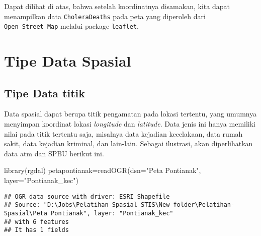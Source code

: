 \documentclass[
]{book}
\newenvironment{Shaded}{\begin{snugshade}}{\end{snugshade}}
\newcommand{\AttributeTok}[1]{\textcolor[rgb]{0.77,0.63,0.00}{#1}}
\newcommand{\DecValTok}[1]{\textcolor[rgb]{0.00,0.00,0.81}{#1}}
\newcommand{\FunctionTok}[1]{\textcolor[rgb]{0.00,0.00,0.00}{#1}}
\newcommand{\NormalTok}[1]{#1}
\newcommand{\OtherTok}[1]{\textcolor[rgb]{0.56,0.35,0.01}{#1}}
\newcommand{\SpecialCharTok}[1]{\textcolor[rgb]{0.00,0.00,0.00}{#1}}
\newcommand{\StringTok}[1]{\textcolor[rgb]{0.31,0.60,0.02}{#1}}
\begin{document}
Dapat dilihat di atas, bahwa setelah koordinatnya disamakan, kita dapat menampilkan data \texttt{CholeraDeaths} pada peta yang diperoleh dari \texttt{Open\ Street\ Map} melalui package \texttt{leaflet}.

\hypertarget{tipe-data-spasial}{%
\section{Tipe Data Spasial}\label{tipe-data-spasial}}

\hypertarget{tipe-data-titik}{%
\subsection{Tipe Data titik}\label{tipe-data-titik}}

Data spasial dapat berupa titik pengamatan pada lokasi tertentu, yang umumnya menyimpan koordinat lokasi \emph{longitude} dan \emph{latitude}. Data jenis ini hanya memiliki nilai pada titik tertentu saja, misalnya data kejadian kecelakaan, data rumah sakit, data kejadian kriminal, dan lain-lain. Sebagai ilustrasi, akan diperlihatkan data atm dan SPBU berikut ini.

\begin{Shaded}
\begin{Highlighting}[]
\FunctionTok{library}\NormalTok{(rgdal)}
\NormalTok{petapontianak}\OtherTok{=}\FunctionTok{readOGR}\NormalTok{(}\AttributeTok{dsn=}\StringTok{"Peta Pontianak"}\NormalTok{, }\AttributeTok{layer=}\StringTok{"Pontianak\_kec"}\NormalTok{)}
\end{Highlighting}
\end{Shaded}

\begin{verbatim}
## OGR data source with driver: ESRI Shapefile 
## Source: "D:\Jobs\Pelatihan Spasial STIS\New folder\Pelatihan-Spasial\Peta Pontianak", layer: "Pontianak_kec"
## with 6 features
## It has 1 fields
\end{verbatim}

\begin{Shaded}
\end{Shaded}
\end{document}
